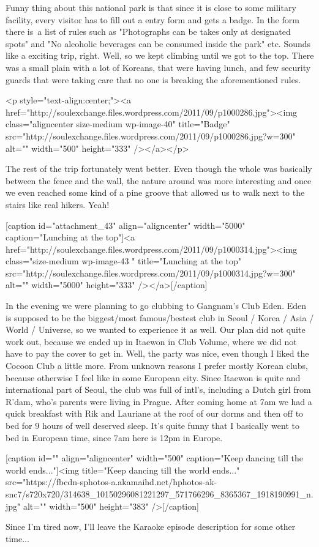 \begin{post}
\begin{content}
Funny thing about this national park is that since it is close to some military facility, every visitor has to fill out a entry form and gets a badge. In the form there is a list of rules such as "Photographs can be takes only at designated spots" and "No alcoholic beverages can be consumed inside the park" etc. Sounds like a exciting trip, right. Well, so we kept climbing until we got to the top. There was a small plain with a lot of Koreans, that were having lunch, and few security guards that were taking care that no one is breaking the aforementioned rules.

<p style="text-align:center;"><a href="http://soulexchange.files.wordpress.com/2011/09/p1000286.jpg"><img class="aligncenter size-medium wp-image-40" title="Badge" src="http://soulexchange.files.wordpress.com/2011/09/p1000286.jpg?w=300" alt="" width="500" height="333" /></a></p>

The rest of the trip fortunately went better. Even though the whole was basically between the fence and the wall, the nature around was more interesting and once we even reached some kind of a pine groove that allowed us to walk next to the stairs like real hikers. Yeah!



[caption id="attachment_43" align="aligncenter" width="5000" caption="Lunching at the top"]<a href="http://soulexchange.files.wordpress.com/2011/09/p1000314.jpg"><img class="size-medium wp-image-43 " title="Lunching at the top" src="http://soulexchange.files.wordpress.com/2011/09/p1000314.jpg?w=300" alt="" width="5000" height="333" /></a>[/caption]



In the evening we were planning to go clubbing to Gangnam's Club Eden. Eden is supposed to be the biggest/most famous/bestest club in Seoul / Korea / Asia / World / Universe, so we wanted to experience it as well. Our plan did not quite work out, because we ended up in Itaewon in Club Volume, where we did not have to pay the cover to get in. Well, the party was nice, even though I liked the Cocoon Club a little more. From unknown reasons I prefer mostly Korean clubs, because otherwise I feel like in some European city. Since Itaewon is quite and international part of Seoul, the club was full of intl's, including a Dutch girl from R'dam, who's parents were living in Prague. After coming home at 7am we had a quick breakfast with Rik and Lauriane at the roof of our dorms and then off to bed for 9 hours of well deserved sleep. It's quite funny that I basically went to bed in European time, since 7am here is 12pm in Europe.



[caption id="" align="aligncenter" width="500" caption="Keep dancing till the world ends..."]<img title="Keep dancing till the world ends..." src="https://fbcdn-sphotos-a.akamaihd.net/hphotos-ak-snc7/s720x720/314638_10150296081221297_571766296_8365367_1918190991_n.jpg" alt="" width="500" height="383" />[/caption]



Since I'm tired now, I'll leave the Karaoke episode description for some other time...
	\end{content}
\end{post}
